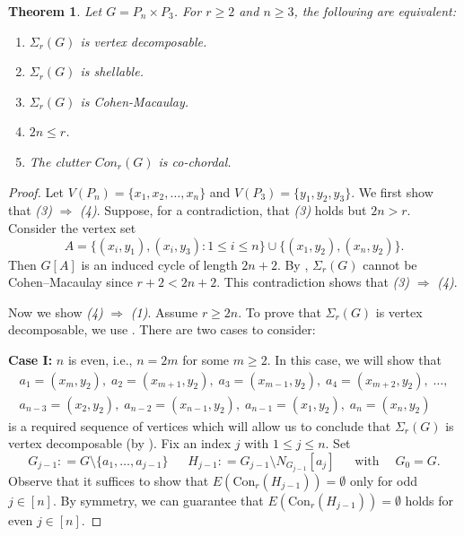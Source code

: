 \documentclass[12pt,reqno]{amsart}
\newtheorem{theorem}[proposition]{Theorem}
\theoremstyle{definition}
\newcommand{\Con}{{\mathrm{Con}}}
\begin{document}
    \begin{theorem}\label{3ladder graph}
		Let $G = P_n \times P_3$. For $r \geq 2$ and $n \geq 3$, the following are equivalent:
		\begin{enumerate}
			\item $\Sigma_r(G)$ is vertex decomposable.
			\item $\Sigma_r(G)$ is shellable.
			\item $\Sigma_r(G)$ is Cohen-Macaulay.
			\item $2n \le r$.
			\item The clutter $Con_r(G)$ is co-chordal.
		\end{enumerate}
	\end{theorem}
	\begin{proof}
		Let $V(P_n) = \{x_1,x_2,\ldots,x_n\}$ and $V(P_3) = \{y_1,y_2,y_3\}$. We first show that \emph{(3)} $\Rightarrow$ \emph{(4)}. Suppose, for a contradiction, that \emph{(3)} holds but $2n > r$. Consider the vertex set
		\[
		A = \{(x_i,y_1), (x_i,y_3) : 1 \leq i \leq n \} \cup \{(x_1,y_2), (x_n,y_2)\}.
		\]
		Then $G[A]$ is an induced cycle of length $2n+2$. By \cite[Theorem~5.3]{LQCG}, $\Sigma_r(G)$ cannot be Cohen–Macaulay since $r+2 < 2n+2$. This contradiction shows that \emph{(3)} $\Rightarrow$ \emph{(4)}.
		
		Now we show \emph{(4)} $\Rightarrow$ \emph{(1)}. Assume $r \geq 2n$. To prove that $\Sigma_r(G)$ is vertex decomposable, we use . There are two cases to consider:
		
		\medskip	
		\noindent
		\textbf{Case I:} $n$ is even, i.e., $n = 2m$ for some $m \geq 2$. In this case, we will show that 
        \begin{multline*}
a_1 = (x_m, y_2),\; a_2 = (x_{m+1}, y_2),\; a_3 = (x_{m-1}, y_2),\; 
a_4 = (x_{m+2}, y_2),\; \ldots,\\
a_{n-3} = (x_2, y_2),\; a_{n-2} = (x_{n-1}, y_2),\;
a_{n-1} = (x_1, y_2),\; a_n = (x_n, y_2)
\end{multline*}
        is a required sequence of vertices which will allow us to conclude that $\Sigma_r(G)$ is vertex decomposable (by ). Fix an index $j$ with $1 \leq j \leq n$. Set 
		\[G_{j-1} : = G \setminus \{a_1,\ldots,a_{j-1}\} \; \quad \; H_{j-1} : = G_{j-1} \setminus N_{G_{j-1}}[a_j] \; \quad \; \text{with}\quad \; G_0 = G.\]
		Observe that it suffices to show that $E(\Con_r(H_{j-1})) = \emptyset$ only for odd $j \in [n]$. By symmetry, we can guarantee that $E(\Con_r(H_{j-1})) = \emptyset$ holds for even $j \in [n]$. 
		

\end{proof}
\end{document}
